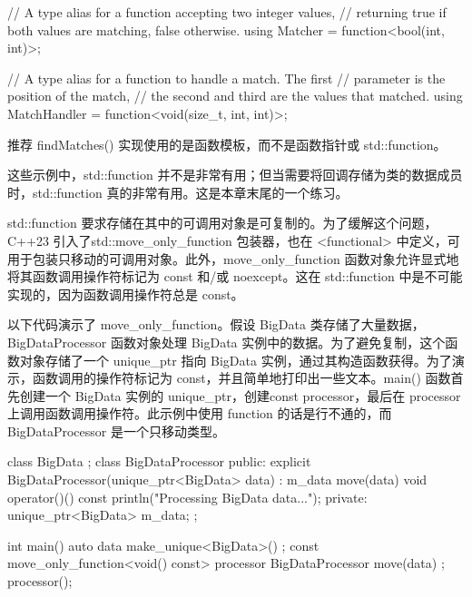 \begin{cpp}
// A type alias for a function accepting two integer values,
// returning true if both values are matching, false otherwise.
using Matcher = function<bool(int, int)>;

// A type alias for a function to handle a match. The first
// parameter is the position of the match,
// the second and third are the values that matched.
using MatchHandler = function<void(size_t, int, int)>;
\end{cpp}

推荐 findMatches() 实现使用的是函数模板，而不是函数指针或 std::function。

这些示例中，std::function 并不是非常有用；但当需要将回调存储为类的数据成员时，std::function 真的非常有用。这是本章末尾的一个练习。



std::function 要求存储在其中的可调用对象是可复制的。为了缓解这个问题，C++23 引入了std::move\_only\_function 包装器，也在 <functional> 中定义，可用于包装只移动的可调用对象。此外，move\_only\_function 函数对象允许显式地将其函数调用操作符标记为 const 和/或 noexcept。这在 std::function 中是不可能实现的，因为函数调用操作符总是 const。

以下代码演示了 move\_only\_function。假设 BigData 类存储了大量数据，BigDataProcessor 函数对象处理 BigData 实例中的数据。为了避免复制，这个函数对象存储了一个 unique\_ptr 指向 BigData 实例，通过其构造函数获得。为了演示，函数调用的操作符标记为 const，并且简单地打印出一些文本。main() 函数首先创建一个 BigData 实例的 unique\_ptr，创建const processor，最后在 processor 上调用函数调用操作符。此示例中使用 function 的话是行不通的，而BigDataProcessor 是一个只移动类型。

\begin{cpp}
class BigData {};
class BigDataProcessor
{
    public:
        explicit BigDataProcessor(unique_ptr<BigData> data)
            : m_data { move(data) } { }
        void operator()() const { println("Processing BigData data..."); }
    private:
     unique_ptr<BigData> m_data;
};

int main()
{
    auto data { make_unique<BigData>() };
    const move_only_function<void() const> processor {
        BigDataProcessor { move(data) } };
    processor();
}
\end{cpp}





























